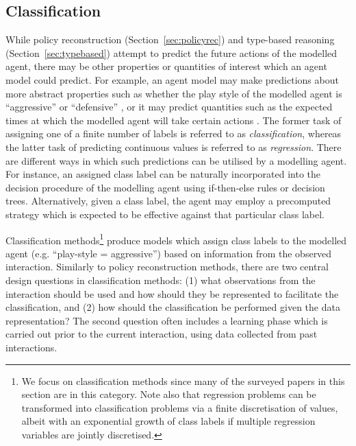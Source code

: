 \documentclass[final,1p,times,authoryear]{elsarticle}
\begin{document}
		\subsection{\bf Classification} \label{sec:classif}

While policy reconstruction (Section~\ref{sec:policyrec}) and type-based reasoning (Section~\ref{sec:typebased}) attempt to predict the future actions of the modelled agent, there may be other properties or quantities of interest which an agent model could predict. For example, an agent model may make predictions about more abstract properties such as whether the play style of the modelled agent is ``aggressive'' or ``defensive'' \citep[e.g.][]{sbp2007}, or it may predict quantities such as the expected times at which the modelled agent will take certain actions \citep[e.g.][]{wm2009}. The former task of assigning one of a finite number of labels is referred to as \emph{classification}, whereas the latter task of predicting continuous values is referred to as \emph{regression}. There are different ways in which such predictions can be utilised by a modelling agent. For instance, an assigned class label can be naturally incorporated into the decision procedure of the modelling agent using if-then-else rules or decision trees. Alternatively, given a class label, the agent may employ a precomputed strategy which is expected to be effective against that particular class label.

Classification methods\footnote{We focus on classification methods since many of the surveyed papers in this section are in this category. Note also that regression problems can be transformed into classification problems via a finite discretisation of values, albeit with an exponential growth of class labels if multiple regression variables are jointly discretised.} produce models which assign class labels to the modelled agent (e.g. ``play-style = aggressive'') based on information from the observed interaction. Similarly to policy reconstruction methods, there are two central design questions in classification methods: (1) what observations from the interaction should be used and how should they be represented to facilitate the classification, and (2) how should the classification be performed given the data representation? The second question often includes a learning phase which is carried out prior to the current interaction, using data collected from past interactions.
\end{document}
